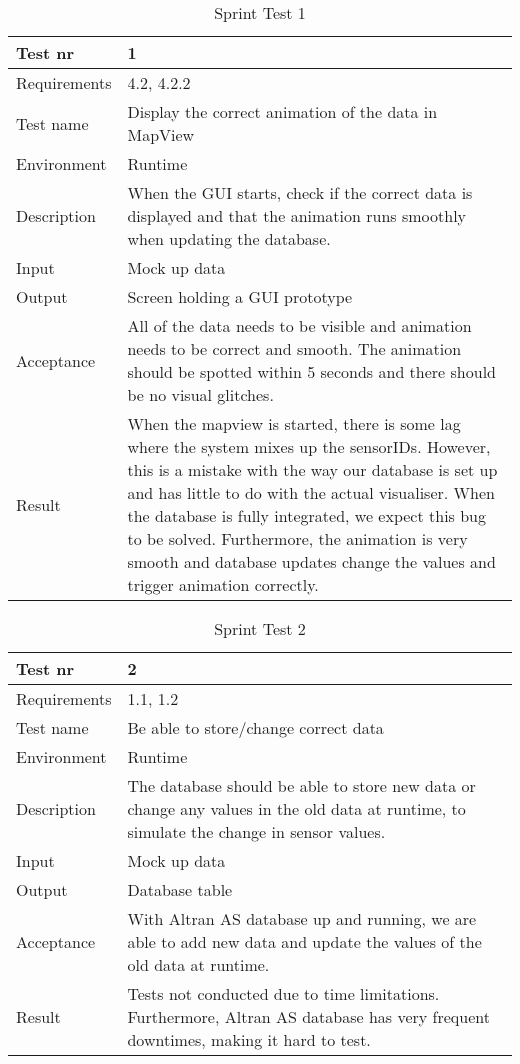 \documentclass[../document]{subfiles}
\begin{document}
\begin{table}[H]
\caption{Sprint Test 1}
\centering
\begin{tabularx}{\textwidth}{|l|X|}
\hline
Test nr
&1
\\ \hline Requirements
&4.2, 4.2.2
\\ \hline Test name
&Display the correct animation of the data in MapView
\\ \hline Environment
&Runtime
\\ \hline Description
&When the GUI starts, check if the correct data is displayed and that the animation runs smoothly when updating the database.
\\ \hline Input
&Mock up data
\\ \hline Output
&Screen holding a GUI prototype
\\ \hline Acceptance
&All of the data needs to be visible and animation needs to be correct and smooth. The animation should be spotted within 5 seconds and there should be no visual glitches.
\\ \hline Result
&When the mapview is started, there is some lag where the system mixes up the sensorIDs. However, this is a mistake with the way our database is set up and has little to do with the actual visualiser. When the database is fully integrated, we expect this bug to be solved. Furthermore, the animation is very smooth and database updates change the values and trigger animation correctly.
\\ \hline 
\end{tabularx}
\end{table}

\begin{table}[H]
\caption{Sprint Test 2}
\centering
\begin{tabularx}{\textwidth}{|l|X|}
\hline
Test nr
&2
\\ \hline Requirements
&1.1, 1.2
\\ \hline Test name
&Be able to store/change correct data
\\ \hline Environment
&Runtime
\\ \hline Description
&The database should be able to store new data or change any values in the old data at runtime, to simulate the change in sensor values.
\\ \hline Input
&Mock up data
\\ \hline Output
&Database table
\\ \hline Acceptance
&With \gls{Altran} AS database up and running, we are able to add new data and update the values of the old data at runtime.
\\ \hline Result
&Tests not conducted due to time limitations. Furthermore, \gls{Altran} AS database has very frequent downtimes, making it hard to test.
\\ \hline 
\end{tabularx}
\end{table}
\end{document}
